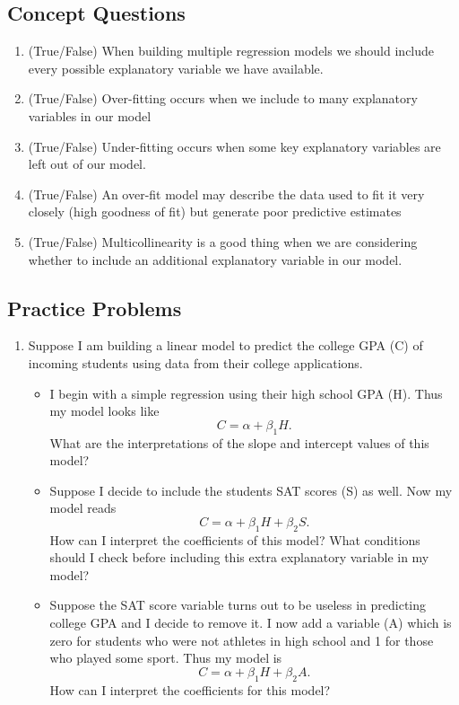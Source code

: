 \documentclass[
]{book}
\providecommand{\tightlist}{%
  \setlength{\itemsep}{0pt}\setlength{\parskip}{0pt}}
\theoremstyle{definition}
\theoremstyle{definition}
\theoremstyle{definition}
\theoremstyle{definition}
\theoremstyle{remark}
\begin{document}
\hypertarget{concept-questions-10}{%
\subsection{Concept Questions}\label{concept-questions-10}}

\begin{enumerate}
\def\labelenumi{\arabic{enumi}.}
\tightlist
\item
  (True/False) When building multiple regression models we should include every possible explanatory variable we have available.
\item
  (True/False) Over-fitting occurs when we include to many explanatory variables in our model
\item
  (True/False) Under-fitting occurs when some key explanatory variables are left out of our model.
\item
  (True/False) An over-fit model may describe the data used to fit it very closely (high goodness of fit) but generate poor predictive estimates
\item
  (True/False) Multicollinearity is a good thing when we are considering whether to include an additional explanatory variable in our model.
\end{enumerate}

\hypertarget{practice-problems-11}{%
\subsection{Practice Problems}\label{practice-problems-11}}

\begin{enumerate}
\def\labelenumi{\arabic{enumi}.}
\item
  Suppose I am building a linear model to predict the college GPA (C) of incoming students using data from their college applications.

  \begin{itemize}
  \tightlist
  \item
    I begin with a simple regression using their high school GPA (H). Thus my model looks like \[C=\alpha+\beta_1 H.\] What are the interpretations of the slope and intercept values of this model?
  \item
    Suppose I decide to include the students SAT scores (S) as well. Now my model reads \[C=\alpha+\beta_1 H+ \beta_2 S.\] How can I interpret the coefficients of this model? What conditions should I check before including this extra explanatory variable in my model?
  \item
    Suppose the SAT score variable turns out to be useless in predicting college GPA and I decide to remove it. I now add a variable (A) which is zero for students who were not athletes in high school and 1 for those who played some sport. Thus my model is \[C=\alpha+\beta_1 H+\beta_2 A.\] How can I interpret the coefficients for this model?
  \end{itemize}
\end{enumerate}
\end{document}
